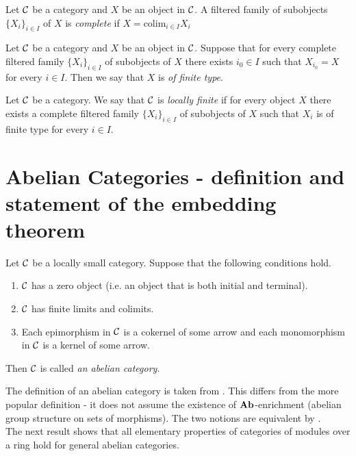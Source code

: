 \begin{definition}
Let ${\mathcal C}$ be a category and $X$ be an object in ${\mathcal C}$. A filtered family of subobjects $\{X_i\}_{i\in I}$ of $X$ is \textit{complete} if $X = \mathrm{colim}_{i\in I}X_i$
\end{definition}

\begin{definition}
Let ${\mathcal C}$ be a category and $X$ be an object in ${\mathcal C}$. Suppose that for every complete filtered family $\{X_i\}_{i\in I}$ of subobjects of $X$ there exists $i_0\in I$ such that $X_{i_0} = X$ for every $i\in I$. Then we say that $X$ is \textit{of finite type}.
\end{definition}

\begin{definition}
Let ${\mathcal C}$ be a category. We say that ${\mathcal C}$ is \textit{locally finite} if for every object $X$ there exists a complete filtered family $\{X_i\}_{i \in I}$ of subobjects of $X$ such that $X_i$ is of finite type for every $i\in I$.
\end{definition}

\section{Abelian Categories - definition and statement of the embedding theorem}

\begin{definition}
Let ${\mathcal C}$ be a locally small category. Suppose that the following conditions hold.
\begin{enumerate}[label=\textbf{(\arabic*)}, leftmargin=1.5em]
\item ${\mathcal C}$ has a zero object (i.e. an object that is both initial and terminal).
\item ${\mathcal C}$ has finite limits and colimits.
\item Each epimorphism in ${\mathcal C}$ is a cokernel of some arrow and each monomorphism in ${\mathcal C}$ is a kernel of some arrow.
\end{enumerate}
Then ${\mathcal C}$ is called \textit{an abelian category}.
\end{definition}
\noindent
The definition of an abelian category is taken from \cite{freyd1964abelian}. This differs from the more popular definition {\cite[page 198]{Maclane}} - it does not assume the existence of $\mathbf{Ab}$-enrichment (abelian group structure on sets of morphisms). The two notions are equivalent by {\cite[Theorem 2.39]{freyd1964abelian}}.\\
The next result shows that all elementary properties of categories of modules over a ring hold for general abelian categories.

